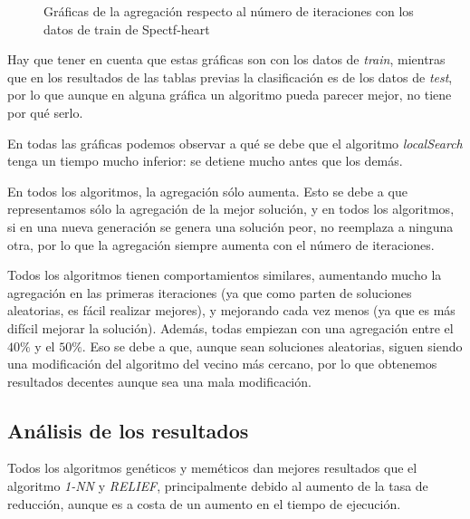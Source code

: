 \documentclass[11pt,a4paper]{article}
\begin{document}
\begin{figure}[H]
	\caption{Gráficas de la agregación respecto al número de iteraciones con los datos de train de Spectf-heart}
\end{figure}

Hay que tener en cuenta que estas gráficas son con los datos de \emph{train}, mientras que en los resultados de las tablas previas la clasificación es de los datos de \emph{test}, por lo que aunque en alguna gráfica un algoritmo pueda parecer mejor, no tiene por qué serlo.

En todas las gráficas podemos observar a qué se debe que el algoritmo \emph{localSearch} tenga un tiempo mucho inferior: se detiene mucho antes que los demás.

En todos los algoritmos, la agregación sólo aumenta. Esto se debe a que representamos sólo la agregación de la mejor solución, y en todos los algoritmos, si en una nueva generación se genera una solución peor, no reemplaza a ninguna otra, por lo que la agregación siempre aumenta con el número de iteraciones.

Todos los algoritmos tienen comportamientos similares, aumentando mucho la agregación en las primeras iteraciones (ya que como parten de soluciones aleatorias, es fácil realizar mejores), y mejorando cada vez menos (ya que es más difícil mejorar la solución). Además, todas empiezan con una agregación entre el $40\%$ y el $50\%$. Eso se debe a que, aunque sean soluciones aleatorias, siguen siendo una modificación del algoritmo del vecino más cercano, por lo que obtenemos resultados decentes aunque sea una mala modificación.

\subsection{Análisis de los resultados}

Todos los algoritmos genéticos y meméticos dan mejores resultados que el algoritmo \emph{1-NN} y \emph{RELIEF}, principalmente debido al aumento de la tasa de reducción, aunque es a costa de un aumento en el tiempo de ejecución.
\end{document}
